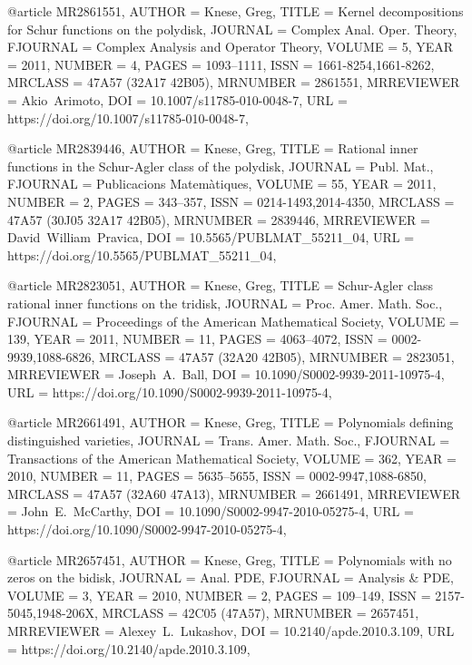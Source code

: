 @article {MR2861551,
    AUTHOR = {Knese, Greg},
     TITLE = {Kernel decompositions for {S}chur functions on the polydisk},
   JOURNAL = {Complex Anal. Oper. Theory},
  FJOURNAL = {Complex Analysis and Operator Theory},
    VOLUME = {5},
      YEAR = {2011},
    NUMBER = {4},
     PAGES = {1093--1111},
      ISSN = {1661-8254,1661-8262},
   MRCLASS = {47A57 (32A17 42B05)},
  MRNUMBER = {2861551},
MRREVIEWER = {Akio\ Arimoto},
       DOI = {10.1007/s11785-010-0048-7},
       URL = {https://doi.org/10.1007/s11785-010-0048-7},
}

@article {MR2839446,
    AUTHOR = {Knese, Greg},
     TITLE = {Rational inner functions in the {S}chur-{A}gler class of the
              polydisk},
   JOURNAL = {Publ. Mat.},
  FJOURNAL = {Publicacions Matem\`atiques},
    VOLUME = {55},
      YEAR = {2011},
    NUMBER = {2},
     PAGES = {343--357},
      ISSN = {0214-1493,2014-4350},
   MRCLASS = {47A57 (30J05 32A17 42B05)},
  MRNUMBER = {2839446},
MRREVIEWER = {David\ William\ Pravica},
       DOI = {10.5565/PUBLMAT\_55211\_04},
       URL = {https://doi.org/10.5565/PUBLMAT_55211_04},
}

@article {MR2823051,
    AUTHOR = {Knese, Greg},
     TITLE = {Schur-{A}gler class rational inner functions on the tridisk},
   JOURNAL = {Proc. Amer. Math. Soc.},
  FJOURNAL = {Proceedings of the American Mathematical Society},
    VOLUME = {139},
      YEAR = {2011},
    NUMBER = {11},
     PAGES = {4063--4072},
      ISSN = {0002-9939,1088-6826},
   MRCLASS = {47A57 (32A20 42B05)},
  MRNUMBER = {2823051},
MRREVIEWER = {Joseph\ A.\ Ball},
       DOI = {10.1090/S0002-9939-2011-10975-4},
       URL = {https://doi.org/10.1090/S0002-9939-2011-10975-4},
}

@article {MR2661491,
    AUTHOR = {Knese, Greg},
     TITLE = {Polynomials defining distinguished varieties},
   JOURNAL = {Trans. Amer. Math. Soc.},
  FJOURNAL = {Transactions of the American Mathematical Society},
    VOLUME = {362},
      YEAR = {2010},
    NUMBER = {11},
     PAGES = {5635--5655},
      ISSN = {0002-9947,1088-6850},
   MRCLASS = {47A57 (32A60 47A13)},
  MRNUMBER = {2661491},
MRREVIEWER = {John\ E.\ McCarthy},
       DOI = {10.1090/S0002-9947-2010-05275-4},
       URL = {https://doi.org/10.1090/S0002-9947-2010-05275-4},
}

@article {MR2657451,
    AUTHOR = {Knese, Greg},
     TITLE = {Polynomials with no zeros on the bidisk},
   JOURNAL = {Anal. PDE},
  FJOURNAL = {Analysis \& PDE},
    VOLUME = {3},
      YEAR = {2010},
    NUMBER = {2},
     PAGES = {109--149},
      ISSN = {2157-5045,1948-206X},
   MRCLASS = {42C05 (47A57)},
  MRNUMBER = {2657451},
MRREVIEWER = {Alexey\ L.\ Lukashov},
       DOI = {10.2140/apde.2010.3.109},
       URL = {https://doi.org/10.2140/apde.2010.3.109},
}

